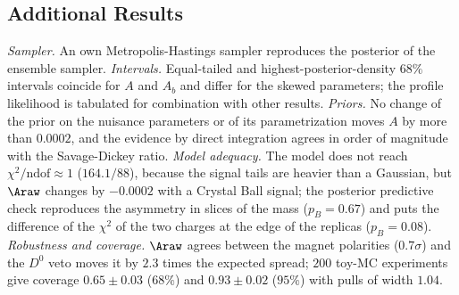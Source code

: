 \subsection{Additional Results}
\emph{Sampler.} An own Metropolis-Hastings sampler reproduces the posterior of the ensemble sampler.
\emph{Intervals.} Equal-tailed and highest-posterior-density $68\%$ intervals coincide for $A$ and $A_b$ and differ for the skewed parameters; the profile likelihood is tabulated for combination with other results.
\emph{Priors.} No change of the prior on the nuisance parameters or of its parametrization moves $A$ by more than $0.0002$, and the evidence by direct integration agrees in order of magnitude with the Savage-Dickey ratio.
\emph{Model adequacy.} The model does not reach $\chi^2/\mathrm{ndof}\approx1$ ($164.1/88$), because the signal tails are heavier than a Gaussian, but $\Araw$ changes by $-0.0002$ with a Crystal Ball signal; the posterior predictive check reproduces the asymmetry in slices of the mass ($p_B=0.67$) and puts the difference of the $\chi^2$ of the two charges at the edge of the replicas ($p_B=0.08$).
\emph{Robustness and coverage.} $\Araw$ agrees between the magnet polarities ($0.7\sigma$) and the $D^0$ veto moves it by $2.3$ times the expected spread; $200$ toy-MC experiments give coverage $0.65\pm0.03$ ($68\%$) and $0.93\pm0.02$ ($95\%$) with pulls of width $1.04$.
